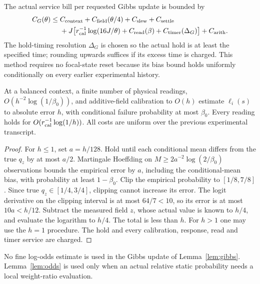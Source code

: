 The actual service bill per requested Gibbs update is bounded by
\begin{equation}\label{eq:gibbscost}
\begin{split}
 C_G(\theta)\le{}&
 C_{\rm context}+C_{\rm field}(\theta/4)+C_{\rm slew}+C_{\rm settle}\\
 &+J\!\left[r_{\rm cal}^{-1}\log(16J/\theta)+C_{\rm read}(\beta)
            +C_{\rm timer}(\Delta_G)\right]+C_{\rm arith}.
\end{split}
\end{equation}
The hold-timing resolution $\Delta_G$ is chosen so the actual hold is at
least the specified time; rounding upwards suffices if its excess time is
charged. This method requires no focal-state reset because its bias bound
holds uniformly conditionally on every earlier experimental history.

\begin{lemma}\label{lem:odds}
At a balanced context, a finite number of physical readings,
$O(h^{-2}\log(1/\beta_0))$, and additive-field
calibration to $O(h)$ estimate $\ell_i(s)$ to absolute error $h$, with
conditional failure probability at most $\beta_0$. Every reading holds for
$O(r_{\rm cal}^{-1}\log(1/h))$. All costs are uniform over the previous
experimental transcript.
\end{lemma}
\begin{proof}
For $h\le1$, set $a=h/128$. Hold until each conditional mean differs from
the true $q_z$ by at most $a/2$. Martingale Hoeffding on
$M\ge2a^{-2}\log(2/\beta_0)$ observations bounds the empirical error by
$a$, including the conditional-mean bias, with probability at least
$1-\beta_0$. Clip the empirical probability to $[1/8,7/8]$. Since true
$q_z\in[1/4,3/4]$, clipping cannot increase its error. The logit derivative
on the clipping interval is at most $64/7<10$, so its error is at most
$10a<h/12$. Subtract the measured field $z$, whose actual value is known
to $h/4$, and evaluate the logarithm to $h/4$. The total is less than $h$.
For $h>1$ one may use the $h=1$ procedure. The hold and every calibration,
response, read and timer service are charged.
\end{proof}

No fine log-odds estimate is used in the Gibbs update of
Lemma~\ref{lem:gibbs}. Lemma~\ref{lem:odds} is used only when an actual
relative static probability needs a local weight-ratio evaluation.

